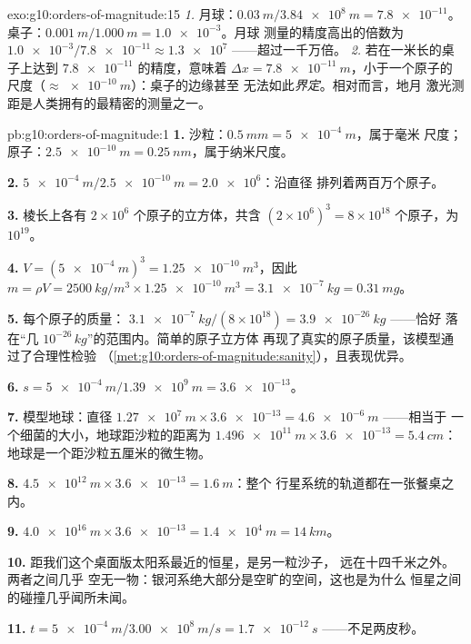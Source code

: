 \begin{solution}{exo:g10:orders-of-magnitude:15}
\emph{1.} 月球：$\qty{0.03}{m}/\qty{3.84e8}{m} = \num{7.8e-11}$。
桌子：$\qty{0.001}{m}/\qty{1.000}{m} = \num{1.0e-3}$。月球
测量的精度高出的倍数为
$\num{1.0e-3}/\num{7.8e-11} \approx \num{1.3e7}$ ——超过一千万倍。
\emph{2.} 若在一米长的桌子上达到 $\num{7.8e-11}$ 的精度，意味着
$\Delta x = \qty{7.8e-11}{m}$，小于一个原子的
尺度（$\approx \qty{e-10}{m}$）：桌子的边缘甚至
无法如此\emph{界定}。相对而言，地月
激光测距是人类拥有的最精密的测量之一。
\end{solution}

\begin{solution}{pb:g10:orders-of-magnitude:1}
\textbf{1.} 沙粒：$\qty{0.5}{mm} = \qty{5e-4}{m}$，属于毫米
尺度；原子：$\qty{2.5e-10}{m} = \qty{0.25}{nm}$，属于纳米尺度。

\textbf{2.} $\qty{5e-4}{m}/\qty{2.5e-10}{m} = \num{2.0e6}$：沿直径
排列着两百万个原子。

\textbf{3.} 棱长上各有 $2 \times 10^{6}$ 个原子的立方体，共含
$(2\times10^{6})^{3} = 8 \times 10^{18}$ 个原子，为
$10^{19}$。

\textbf{4.} $V = (\qty{5e-4}{m})^{3} = \qty{1.25e-10}{m^3}$，因此
$m = \rho V = \qty{2500}{kg/m^3} \times \qty{1.25e-10}{m^3}
= \qty{3.1e-7}{kg} = \qty{0.31}{mg}$。

\textbf{5.} 每个原子的质量：
$\qty{3.1e-7}{kg}/(8\times10^{18}) = \qty{3.9e-26}{kg}$ ——恰好
落在“几 $10^{-26}\,\unit{kg}$”的范围内。简单的原子立方体
再现了真实的原子质量，该模型通过了合理性检验
（\cref{met:g10:orders-of-magnitude:sanity}），且表现优异。

\textbf{6.} $s = \qty{5e-4}{m}/\qty{1.39e9}{m} = \num{3.6e-13}$。

\textbf{7.} 模型地球：直径
$\qty{1.27e7}{m} \times \num{3.6e-13} = \qty{4.6e-6}{m}$ ——相当于
一个细菌的大小，地球距沙粒的距离为
$\qty{1.496e11}{m} \times \num{3.6e-13} = \qty{5.4}{cm}$：
地球是一个距沙粒五厘米的微生物。

\textbf{8.} $\qty{4.5e12}{m} \times \num{3.6e-13} = \qty{1.6}{m}$：整个
行星系统的轨道都在一张餐桌之内。

\textbf{9.} $\qty{4.0e16}{m} \times \num{3.6e-13} = \qty{1.4e4}{m}
= \qty{14}{km}$。

\textbf{10.} 距我们这个桌面版太阳系最近的恒星，是另一粒沙子，
远在十四千米之外。两者之间几乎
空无一物：银河系绝大部分是空旷的空间，这也是为什么
恒星之间的碰撞几乎闻所未闻。

\textbf{11.} $t = \qty{5e-4}{m}/\qty{3.00e8}{m/s} = \qty{1.7e-12}{s}$
——不足两皮秒。


\end{solution}
